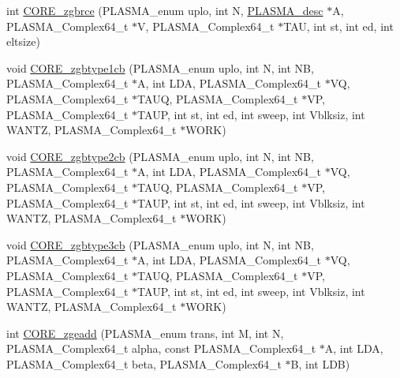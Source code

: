 \begin{DoxyCompactItemize}
\item 
int \hyperlink{group__CORE__PLASMA__Complex64__t_ga1e50e794bdcb961cb885640148c6fea1_ga1e50e794bdcb961cb885640148c6fea1}{C\+O\+R\+E\+\_\+zgbrce} (P\+L\+A\+S\+M\+A\+\_\+enum uplo, int N, \hyperlink{structplasma__desc__t}{P\+L\+A\+S\+M\+A\+\_\+desc} $\ast$A, P\+L\+A\+S\+M\+A\+\_\+\+Complex64\+\_\+t $\ast$V, P\+L\+A\+S\+M\+A\+\_\+\+Complex64\+\_\+t $\ast$T\+A\+U, int st, int ed, int eltsize)
\item 
void \hyperlink{group__CORE__PLASMA__Complex64__t_ga1b3e81f31fb420ee4a05b581e232adda_ga1b3e81f31fb420ee4a05b581e232adda}{C\+O\+R\+E\+\_\+zgbtype1cb} (P\+L\+A\+S\+M\+A\+\_\+enum uplo, int N, int N\+B, P\+L\+A\+S\+M\+A\+\_\+\+Complex64\+\_\+t $\ast$A, int L\+D\+A, P\+L\+A\+S\+M\+A\+\_\+\+Complex64\+\_\+t $\ast$V\+Q, P\+L\+A\+S\+M\+A\+\_\+\+Complex64\+\_\+t $\ast$T\+A\+U\+Q, P\+L\+A\+S\+M\+A\+\_\+\+Complex64\+\_\+t $\ast$V\+P, P\+L\+A\+S\+M\+A\+\_\+\+Complex64\+\_\+t $\ast$T\+A\+U\+P, int st, int ed, int sweep, int Vblksiz, int W\+A\+N\+T\+Z, P\+L\+A\+S\+M\+A\+\_\+\+Complex64\+\_\+t $\ast$W\+O\+R\+K)
\item 
void \hyperlink{group__CORE__PLASMA__Complex64__t_gaa3e1341229738bb58022b1a6a130f567_gaa3e1341229738bb58022b1a6a130f567}{C\+O\+R\+E\+\_\+zgbtype2cb} (P\+L\+A\+S\+M\+A\+\_\+enum uplo, int N, int N\+B, P\+L\+A\+S\+M\+A\+\_\+\+Complex64\+\_\+t $\ast$A, int L\+D\+A, P\+L\+A\+S\+M\+A\+\_\+\+Complex64\+\_\+t $\ast$V\+Q, P\+L\+A\+S\+M\+A\+\_\+\+Complex64\+\_\+t $\ast$T\+A\+U\+Q, P\+L\+A\+S\+M\+A\+\_\+\+Complex64\+\_\+t $\ast$V\+P, P\+L\+A\+S\+M\+A\+\_\+\+Complex64\+\_\+t $\ast$T\+A\+U\+P, int st, int ed, int sweep, int Vblksiz, int W\+A\+N\+T\+Z, P\+L\+A\+S\+M\+A\+\_\+\+Complex64\+\_\+t $\ast$W\+O\+R\+K)
\item 
void \hyperlink{group__CORE__PLASMA__Complex64__t_gadc4bf1b9278eb04a65bcece072c2b58e_gadc4bf1b9278eb04a65bcece072c2b58e}{C\+O\+R\+E\+\_\+zgbtype3cb} (P\+L\+A\+S\+M\+A\+\_\+enum uplo, int N, int N\+B, P\+L\+A\+S\+M\+A\+\_\+\+Complex64\+\_\+t $\ast$A, int L\+D\+A, P\+L\+A\+S\+M\+A\+\_\+\+Complex64\+\_\+t $\ast$V\+Q, P\+L\+A\+S\+M\+A\+\_\+\+Complex64\+\_\+t $\ast$T\+A\+U\+Q, P\+L\+A\+S\+M\+A\+\_\+\+Complex64\+\_\+t $\ast$V\+P, P\+L\+A\+S\+M\+A\+\_\+\+Complex64\+\_\+t $\ast$T\+A\+U\+P, int st, int ed, int sweep, int Vblksiz, int W\+A\+N\+T\+Z, P\+L\+A\+S\+M\+A\+\_\+\+Complex64\+\_\+t $\ast$W\+O\+R\+K)
\item 
int \hyperlink{group__CORE__PLASMA__Complex64__t_ga1403b3ba4810f37457f8baee4e610f5c_ga1403b3ba4810f37457f8baee4e610f5c}{C\+O\+R\+E\+\_\+zgeadd} (P\+L\+A\+S\+M\+A\+\_\+enum trans, int M, int N, P\+L\+A\+S\+M\+A\+\_\+\+Complex64\+\_\+t alpha, const P\+L\+A\+S\+M\+A\+\_\+\+Complex64\+\_\+t $\ast$A, int L\+D\+A, P\+L\+A\+S\+M\+A\+\_\+\+Complex64\+\_\+t beta, P\+L\+A\+S\+M\+A\+\_\+\+Complex64\+\_\+t $\ast$B, int L\+D\+B)

\end{DoxyCompactItemize}
